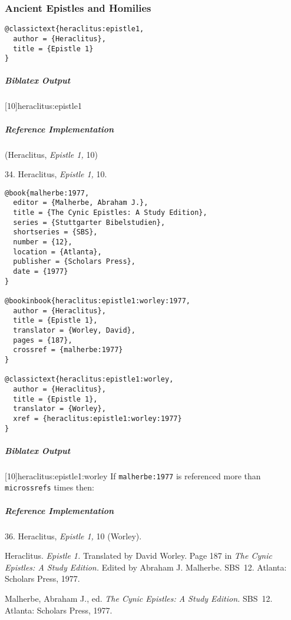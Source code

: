 \documentclass[a4paper]{article}
\newenvironment{biboutput}{%
  \subparagraph{Biblatex Output}
}{\color{black}}
\newenvironment{refimp}{%
  \subparagraph{Reference Implementation}
  \color{reference-colour}
  \rm
}{\par\color{black}}
\begin{document}
\subsubsection{Ancient Epistles and Homilies}

\begin{lstlisting}
@classictext{heraclitus:epistle1,
  author = {Heraclitus},
  title = {Epistle 1}
}
\end{lstlisting}

\begin{biboutput}
  [10]{heraclitus:epistle1}
\end{biboutput}

\begin{refimp}
  (Heraclitus, \emph{Epistle 1,} 10)

  \hspace*{\bibindent}34. Heraclitus, \emph{Epistle 1,} 10.
\end{refimp}

\begin{lstlisting}
@book{malherbe:1977,
  editor = {Malherbe, Abraham J.},
  title = {The Cynic Epistles: A Study Edition},
  series = {Stuttgarter Bibelstudien},
  shortseries = {SBS},
  number = {12},
  location = {Atlanta},
  publisher = {Scholars Press},
  date = {1977}
}

@bookinbook{heraclitus:epistle1:worley:1977,
  author = {Heraclitus},
  title = {Epistle 1},
  translator = {Worley, David},
  pages = {187},
  crossref = {malherbe:1977}
}

@classictext{heraclitus:epistle1:worley,
  author = {Heraclitus},
  title = {Epistle 1},
  translator = {Worley},
  xref = {heraclitus:epistle1:worley:1977}
}
\end{lstlisting}

\begin{biboutput}
  [10]{heraclitus:epistle1:worley}
  If \texttt{malherbe:1977} is referenced more than \texttt{microssrefs} times
  then:\par
\end{biboutput}

\begin{refimp}
  \hspace*{\bibindent}36. Heraclitus, \emph{Epistle 1,} 10 (Worley).

  \hangindent\bibindent Heraclitus. \emph{Epistle 1.} Translated by David
  Worley. Page 187 in \emph{The Cynic Epistles: A Study Edition.} Edited by
  Abraham J. Malherbe. SBS~12. Atlanta: Scholars Press, 1977.

  \hangindent\bibindent Malherbe, Abraham J., ed. \emph{The Cynic Epistles: A
  Study Edition.} SBS~12. Atlanta: Scholars Press, 1977.

\end{refimp}
\end{document}
